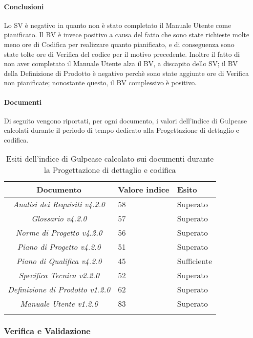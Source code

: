 \paragraph{Conclusioni}
Lo SV è negativo in quanto non è stato completato il Manuale Utente come pianificato.
Il BV è invece positivo a causa del fatto che sono state richieste molte meno ore di Codifica per realizzare quanto pianificato, e di conseguenza sono state tolte ore di Verifica del codice per il motivo precedente.
Inoltre il fatto di non aver completato il Manuale Utente alza il BV, a discapito dello SV; il BV della Definizione di Prodotto è negativo perchè sono state aggiunte ore di Verifica non pianificate; nonostante questo, il BV complessivo è positivo.


\paragraph{Documenti}
Di seguito vengono riportati, per ogni documento, i valori dell'indice di Gulpease calcolati durante il periodo di tempo dedicato alla Progettazione di dettaglio e codifica.

\begin{longtable}{|c|p{3cm}|p{3cm}|}
\toprule
\textbf{Documento} & \textbf{Valore indice} & \textbf{Esito} \\


\midrule
\emph{Analisi dei Requisiti v4.2.0} & 58 & Superato \\
\midrule
\emph{Glossario v4.2.0} & 57 & Superato \\
\midrule
\emph{Norme di Progetto v4.2.0} & 56 & Superato \\
\midrule
\emph{Piano di Progetto v4.2.0} & 51 & Superato\\
\midrule
\emph{Piano di Qualifica v4.2.0} & 45 & Sufficiente \\
\midrule
\emph{Specifica Tecnica v2.2.0} & 52 & Superato\\
\midrule
\emph{Definizione di Prodotto v1.2.0} & 62 & Superato\\
\midrule
\emph{Manuale Utente v1.2.0} & 83 & Superato\\
\bottomrule
\caption{Esiti dell'indice di Gulpease calcolato sui documenti durante la Progettazione di dettaglio e codifica}
\label{tab:changelog}
\end{longtable}

\subsubsection{Verifica e Validazione}
